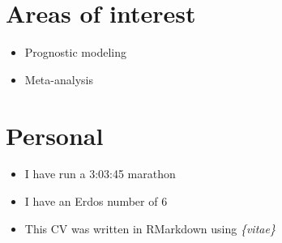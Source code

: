 \documentclass[11pt,a4paper,]{awesome-cv}
\providecommand{\tightlist}{%
	\setlength{\itemsep}{0pt}\setlength{\parskip}{0pt}}
\begin{document}
\hypertarget{areas-of-interest}{%
\section{Areas of interest}\label{areas-of-interest}}

\begin{itemize}
\tightlist
\item
  Prognostic modeling
\item
  Meta-analysis
\end{itemize}

\hypertarget{personal}{%
\section{Personal}\label{personal}}

\begin{itemize}
\tightlist
\item
  I have run a 3:03:45 marathon
\item
  I have an Erdos number of 6
\item
  This CV was written in RMarkdown using \emph{\{vitae\}}
\end{itemize}


\label{LastPage}~
\end{document}
